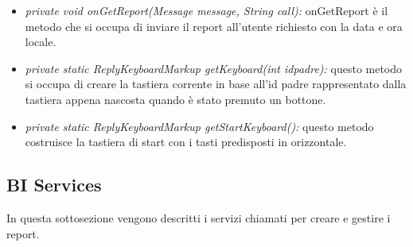 \begin{itemize}
 \item \textit{private void onGetReport(Message message, String call):}
onGetReport è il metodo che si occupa di inviare il report all’utente richiesto con la data e ora locale.

\item \textit{private static ReplyKeyboardMarkup getKeyboard(int idpadre):}
questo metodo si occupa di creare la tastiera corrente in base all’id padre rappresentato dalla tastiera appena nascosta quando è stato premuto un bottone. 

\item \textit{private static ReplyKeyboardMarkup getStartKeyboard():}
questo metodo costruisce la tastiera di start con i tasti predisposti in orizzontale.

\end{itemize}

\subsection{BI Services}

In questa sottosezione vengono descritti i servizi chiamati per creare e gestire i report. \\

